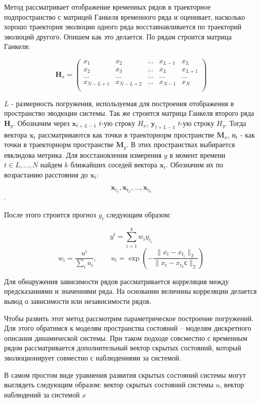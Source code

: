 \documentclass[12pt, twoside]{article}
\begin{document}
	Метод рассматривает отображение временных рядов в траекторное подпространство с матрицей Ганкеля временного ряда и оценивает, насколько хорошо траектория эволюции одного ряда восставнавливается по траекторий эволюций другого. Опишем как это делается. По рядам строится матрица Ганкеля:
	
	$$
	\mathbf{H}_{x} =
	\left( {\begin{array}{ccccc}
			x_1 & x_2 & ... & x_{L-1} & x_L\\
			x_2 & x_3 & ... & x_{L} & x_{L +1}\\
			... & ... & ... & ...   & ... \\
			x_{N-L+1} & x_{N-L +2} & ... & x_{N-1} & x_N\\
	\end{array} } \right)
	$$
	
	$L$ - размерность погружения, используемая для построения отображения в пространство эводюции системы. Так же строится матрица Ганкеля второго ряда $\mathbf{H}_y$.
	Обозначим через $\mathbf{x}_{t+L -1}$ $t$-ую строку $H_x$, $\mathbf{y}_{t+L -1}$ $t$-ую строку $H_y$. Тогда вектора $\mathbf{x}_t$ рассматриваются как точки в траекторнорм пространстве $\mathbf{M}_x$, $\mathbf{н}_t$ - как точки в траекторнорм пространстве $\mathbf{M}_y$. В этих пространствах выбирается евклидова метрика.
	Для восстановления измерения $y$ в момент времени $t\in L,..., N$ найдем $k$ ближайших соседей вектора $\mathbf{x}_t$. Обозначим их по возрастанию расстояния до $\mathbf{x}_t$:
	
	$$\mathbf{x}_{t_1}, \mathbf{x}_{t_2}, ...,\mathbf{x}_{t_k}$$. 
	
	После этого строится прогноз $y_t$ следующим образом:
	
	$$
	y^t = \sum^k_{i = 1}w_iy_{t_i}$$
		$$	w_i = \frac{u^i}{\sum_i u_i}, \qquad u_i = \exp(-\frac{\|x_t - x_{t_i}\|_2}{\|x_t - x_{t_k}с\|_2})
	$$
	
	Для обнаружения зависимости рядов рассматривается корреляция между предсказаниями и значениями ряда. На основании величины корреляции делается вывод о зависимости или независимости рядов.
	
	Чтобы развить этот метод рассмотрим параметрическое построение погружений. Для этого обратимся к моделям пространства состояний -- моделям дискретного описания динамической системы. При таком подходе совсместно с временным рядом рассматривается дополнительный вектор скрытых состояний, который эволюционирует совместно с наблюдениями за системой.
	
	В самом простом виде уравнения развития скрытых состояний системы могут выглядеть следующим образом: вектор скрытых состояний системы $u$, вектор наблюдений за системой $x$
\end{document}
